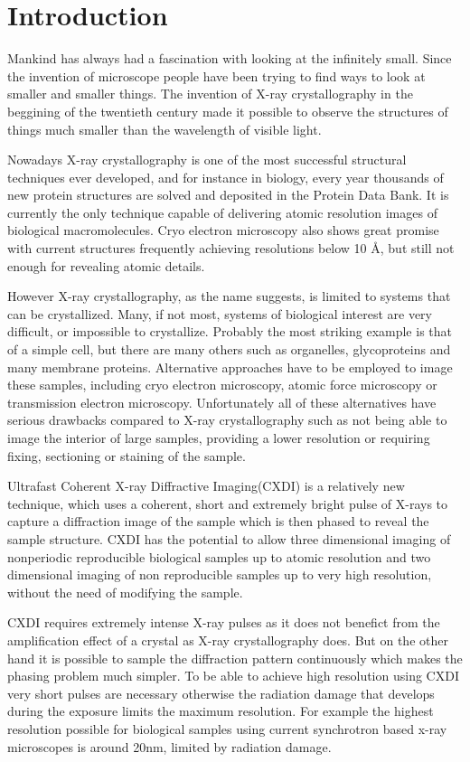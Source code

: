 \chapter{Introduction}\label{introduction}\noindent

Mankind has always had a fascination with looking at the infinitely
small. Since the invention of microscope people have been trying to find ways to
look at smaller and smaller things. The invention of X-ray crystallography in
the beggining of the twentieth century made it possible to observe the
structures of things much smaller than the wavelength of visible light.

Nowadays X-ray crystallography is one of the most successful structural techniques ever
developed, and for instance in biology, every year thousands of new protein structures are solved and deposited
in the Protein Data Bank. It is currently the only technique capable of
delivering atomic resolution images of biological macromolecules. Cryo electron microscopy also shows great promise with current
structures frequently achieving resolutions below 10 \AA, but still not enough
for revealing atomic details.

However X-ray crystallography, as the name suggests, is limited to systems that
can be crystallized. Many, if not most, systems of biological interest are very
difficult, or impossible to crystallize. Probably the most striking example is
that of a simple cell, but there are many others such as organelles, glycoproteins and many
membrane proteins. Alternative approaches have to be employed to image these
samples, including cryo electron microscopy, atomic force microscopy or
transmission electron microscopy. Unfortunately all of these alternatives have
serious drawbacks compared to X-ray crystallography such as not being able to
image the interior of large samples, providing a lower resolution or requiring
fixing, sectioning or staining of the sample.

Ultrafast Coherent X-ray Diffractive Imaging(CXDI) is a relatively new
technique, which uses a coherent, short and extremely
bright pulse of X-rays to capture a diffraction image of the sample which is
then phased to reveal the sample structure. CXDI has the potential to allow three
dimensional imaging of nonperiodic reproducible biological samples up to atomic
resolution and two dimensional imaging of non reproducible samples up to
very high resolution, without the need of modifying the sample.

CXDI requires extremely intense X-ray pulses as it does not benefict from the
amplification effect of a crystal as X-ray crystallography does. But on the
other hand it is possible to sample the diffraction pattern continuously which
makes the phasing problem much simpler. To be able to achieve high 
resolution using CXDI very short pulses are necessary otherwise the radiation
damage that develops during the exposure limits the maximum resolution. For
example the highest resolution possible for biological samples using current
synchrotron based x-ray microscopes is around 20nm, limited by radiation
damage. \cite{MalcomDamage}

